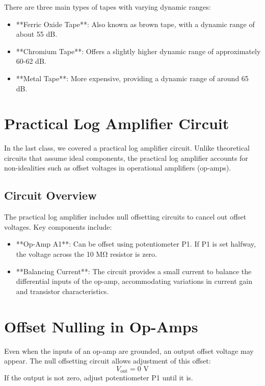 There are three main types of tapes with varying dynamic ranges:
\begin{itemize}
    \item **Ferric Oxide Tape**: Also known as brown tape, with a dynamic range of about 55 dB.
    \item **Chromium Tape**: Offers a slightly higher dynamic range of approximately 60-62 dB.
    \item **Metal Tape**: More expensive, providing a dynamic range of around 65 dB.
\end{itemize}

\section{Practical Log Amplifier Circuit}

In the last class, we covered a practical log amplifier circuit. Unlike theoretical circuits that assume ideal components, the practical log amplifier accounts for non-idealities such as offset voltages in operational amplifiers (op-amps).

\subsection{Circuit Overview}

The practical log amplifier includes null offsetting circuits to cancel out offset voltages. Key components include:
\begin{itemize}
    \item **Op-Amp A1**: Can be offset using potentiometer P1. If P1 is set halfway, the voltage across the 10 MΩ resistor is zero.
    \item **Balancing Current**: The circuit provides a small current to balance the differential inputs of the op-amp, accommodating variations in current gain and transistor characteristics.
\end{itemize}

\section{Offset Nulling in Op-Amps}

Even when the inputs of an op-amp are grounded, an output offset voltage may appear. The null offsetting circuit allows adjustment of this offset:
\begin{equation}
    V_{\text{out}} = 0 \text{ V}
\end{equation}
If the output is not zero, adjust potentiometer P1 until it is.

